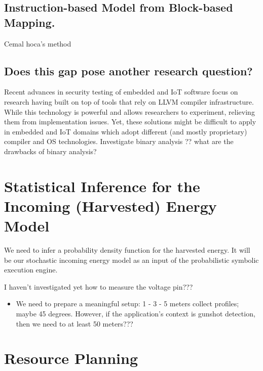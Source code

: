 \documentclass[]{article}
\providecommand{\tightlist}{%
  \setlength{\itemsep}{0pt}\setlength{\parskip}{0pt}}
\begin{document}
\hypertarget{instruction-based-model-from-block-based-mapping.}{%
\subsection{Instruction-based Model from Block-based Mapping.}\label{instruction-based-model-from-block-based-mapping.}}

Cemal hoca's method

\hypertarget{does-this-gap-pose-another-research-question}{%
\subsection{Does this gap pose another research question?}\label{does-this-gap-pose-another-research-question}}

Recent advances in security testing of embedded and IoT software focus on research having built on top of tools that rely on LLVM compiler infrastructure. While this technology is powerful and allows researchers to experiment, relieving them from implementation issues. Yet, these solutions might be difficult to apply in embedded and IoT domains which adopt different (and mostly proprietary) compiler and OS technologies. Investigate binary analysis ?? what are the drawbacks of binary analysis?

\hypertarget{statistical-inference-for-the-incoming-harvested-energy-model}{%
\section{Statistical Inference for the Incoming (Harvested) Energy Model}\label{statistical-inference-for-the-incoming-harvested-energy-model}}

We need to infer a probability density function for the harvested energy. It will be our stochastic incoming energy model as an input of the probabilistic symbolic execution engine.

I haven't investigated yet how to measure the voltage pin???

\begin{itemize}
\tightlist
\item
  We need to prepare a meaningful setup: 1 - 3 - 5 meters collect profiles; maybe 45 degrees. However, if the application's context is gunshot detection, then we need to at least 50 meters???
\end{itemize}

\hypertarget{resource-planning}{%
\section{Resource Planning}\label{resource-planning}}
\end{document}
